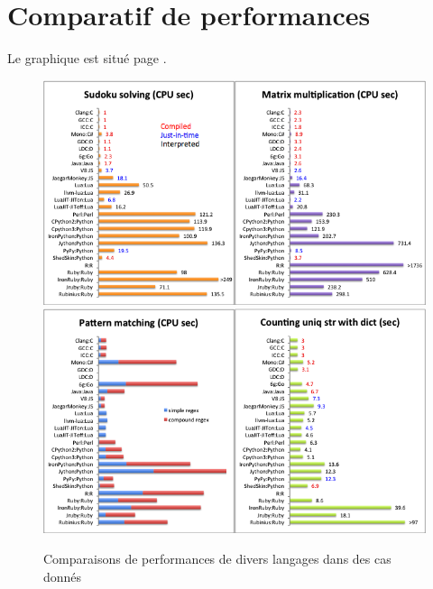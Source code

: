 \documentclass[a4paper]{article}
\newcommand{\alinea}{\hspace*{0.5cm}}
\begin{document}
    \section{Comparatif de performances}
      \alinea Le graphique est situé page \pageref{DiagAnalyse}.
      \begin{figure}
        \begin{center}
          \includegraphics[scale=0.5]{img/AnalyseLangage1.png}
          \includegraphics[scale=0.5]{img/AnalyseLangage2.png} 
        \end{center}
        \label{DiagAnalyse}
        \caption{Comparaisons de performances de divers langages dans des cas donnés}
      \end{figure}
      
\end{document}
